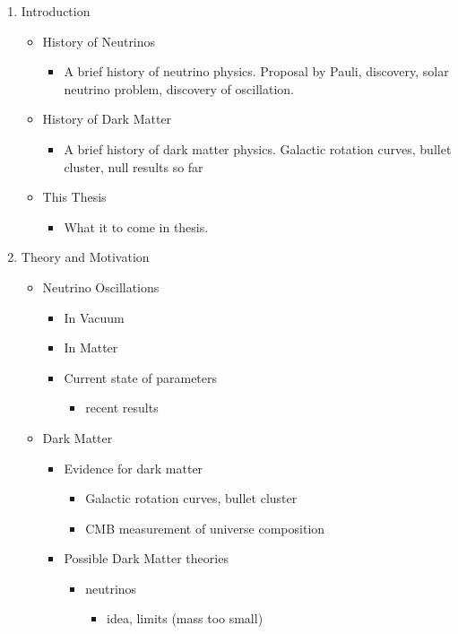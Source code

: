 \documentclass[12pt,oneside,openright]{article}
\begin{document}
\begin{enumerate}
\item Introduction
	\begin{itemize} 
	\item History of Neutrinos 
		\begin{itemize}
		\item A brief history of neutrino physics.  Proposal by Pauli, discovery, solar neutrino problem, discovery of oscillation. 
		\end{itemize}
	\item History of Dark Matter
		\begin{itemize}
		\item A brief history of dark matter physics.  Galactic rotation curves, bullet cluster, null results so far
		\end{itemize}
	\item This Thesis
		\begin{itemize}
		\item What it to come in thesis.
		\end{itemize}
	\end{itemize} 
\item Theory and Motivation
	\begin{itemize}
	\item Neutrino Oscillations
		\begin{itemize}
		\item In Vacuum
		\item In Matter
		\item Current state of parameters
			\begin{itemize}
			\item recent results
			\end{itemize}
		\end{itemize}
	\item Dark Matter
		\begin{itemize}
		\item Evidence for dark matter
			\begin{itemize}
			\item Galactic rotation curves, bullet cluster
			\item CMB measurement of universe composition	
			\end{itemize}
		\item Possible Dark Matter theories
			\begin{itemize}
			\item neutrinos
				\begin{itemize}					
				\item idea, limits (mass too small)

\end{itemize}
\end{itemize}
\end{itemize}
\end{itemize}
\end{enumerate}
\end{document}
